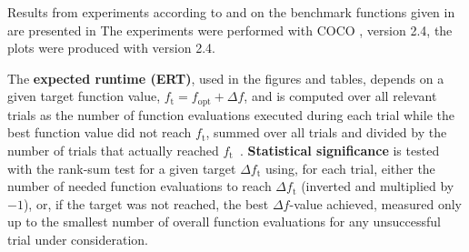 \documentclass[sigconf]{acmart}
\newcommand{\Df}{\ensuremath{\Delta f}}
\newcommand{\fopt}{\ensuremath{f_\mathrm{opt}}}
\newcommand{\ftarget}{\ensuremath{f_\mathrm{t}}}
\newcommand{\change}[1]{{\color{red} #1}}
\begin{document}
Results from experiments according to \cite{hansen2016exp} and \cite{hansen2016perfass} on the
benchmark functions given in \cite{elhara:hal-02068407} are
presented in
The experiments were performed with COCO \cite{hansen2020cocoplat}, version
\change{2.4}, the plots were produced with version \change{2.4}.

The \textbf{expected runtime (ERT)}, used in the figures and tables,
depends on a given target function value, $\ftarget=\fopt+\Df$, and is
computed over all relevant trials as the number of function
evaluations executed during each trial while the best function value
did not reach \ftarget, summed over all trials and divided by the
number of trials that actually reached \ftarget\
\cite{hansen2012exp,price1997dev}. 
\textbf{Statistical significance} is tested with the rank-sum test for a given
target $\Delta\ftarget$ using, for each trial,
either the number of needed function evaluations to reach
$\Delta\ftarget$ (inverted and multiplied by $-1$), or, if the target
was not reached, the best $\Df$-value achieved, measured only up to
the smallest number of overall function evaluations for any
unsuccessful trial under consideration.
\end{document}
